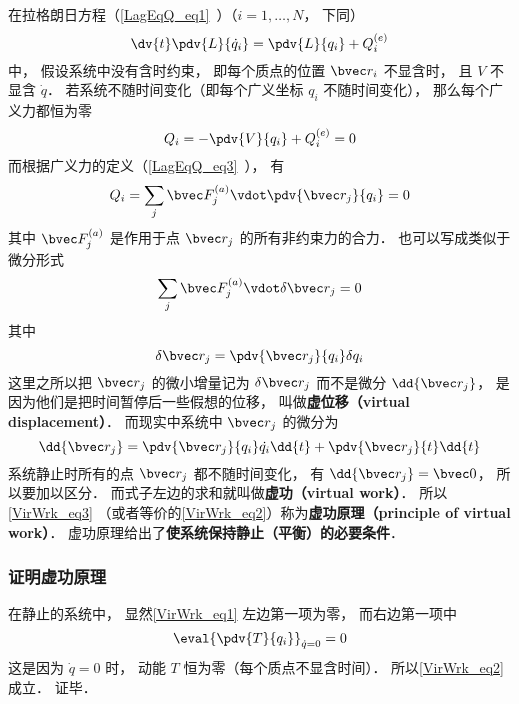 
\begin{issues}
\issueTODO
\end{issues}


在拉格朗日方程（\autoref{LagEqQ_eq1}~）（$i=1,\dots,N$， 下同）
\begin{equation}\label{VirWrk_eq1}
\dv{t} \pdv{L}{\dot q_i} = \pdv{L}{q_i} + Q_i^{(e)}
\end{equation}
中， 假设系统中没有含时约束， 即每个质点的位置 $\bvec r_i$ 不显含时， 且 $V$ 不显含 $\dot q$． 若系统不随时间变化（即每个广义坐标 $q_i$ 不随时间变化）， 那么每个广义力都恒为零
\begin{equation}\label{VirWrk_eq2}
Q_i = -\pdv{V}{q_i} + Q_i^{(e)} = 0
\end{equation}
而根据广义力的定义（\autoref{LagEqQ_eq3}~）， 有
\begin{equation}
Q_i = \sum_j \bvec F_j^{(a)} \vdot \pdv{\bvec r_j}{q_i} = 0
\end{equation}
其中 $\bvec F_j^{(a)}$ 是作用于点 $\bvec r_j$ 的所有非约束力的合力． 也可以写成类似于微分形式
\begin{equation}\label{VirWrk_eq3}
\sum_j \bvec F_j^{(a)} \vdot \delta \bvec r_j = 0
\end{equation}
其中
\begin{equation}
\delta \bvec r_j = \pdv{\bvec r_j}{q_i}\delta{q_i}
\end{equation}
这里之所以把 $\bvec r_j$ 的微小增量记为 $\delta \bvec r_j$ 而不是微分 $\dd{\bvec r_j}$， 是因为他们是把时间暂停后一些假想的位移， 叫做\textbf{虚位移（virtual displacement）}． 而现实中系统中 $\bvec r_j$ 的微分为
\begin{equation}
\dd{\bvec r_j} = \pdv{\bvec r_j}{q_i}\dot{q_i}\dd{t} + \pdv{\bvec r_j}{t}\dd{t}
\end{equation}
系统静止时所有的点 $\bvec r_j$ 都不随时间变化， 有 $\dd{\bvec r_j} = \bvec 0$， 所以要加以区分． 而式子左边的求和就叫做\textbf{虚功（virtual work）}． 所以\autoref{VirWrk_eq3} （或者等价的\autoref{VirWrk_eq2}）称为\textbf{虚功原理（principle of virtual work）}． 虚功原理给出了\textbf{使系统保持静止（平衡）的必要条件}．

\subsubsection{证明虚功原理}
在静止的系统中， 显然\autoref{VirWrk_eq1} 左边第一项为零， 而右边第一项中
\begin{equation}
\eval{\pdv{T}{q_i}}_{\dot q = 0} = 0
\end{equation}
这是因为 $\dot q = 0$ 时， 动能 $T$ 恒为零（每个质点不显含时间）． 所以\autoref{VirWrk_eq2} 成立． 证毕．

